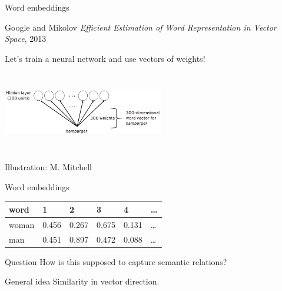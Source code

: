 \documentclass[
  10pt,
  ignorenonframetext,
  x11names, dvipsnames, bibspacing,natbib, table]{beamer}
\begin{document}
\begin{frame}{Word embeddings}
\protect\hypertarget{word-embeddings-6}{}
\begin{block}{Google and Mikolov}
\protect\hypertarget{google-and-mikolov-1}{}
\emph{Efficient Estimation of Word Representation in Vector Space}, 2013

Let's train a neural network and use vectors of weights!

\vspace{2mm}

\begin{center}
 \includegraphics[height = 3.5cm, width = 7cm]{images/word2vec2.png}
\end{center}

\vspace{-3mm}

\tiny \hfill \color{gray}Illustration: M. Mitchell \color{black}
\end{block}
\end{frame}

\begin{frame}{Word embeddings}
\protect\hypertarget{word-embeddings-7}{}
\begin{longtable}[]{@{}llllll@{}}
\toprule
word & 1 & 2 & 3 & 4 & \ldots{} \\
\midrule
\endhead
woman & 0.456 & 0.267 & 0.675 & 0.131 & \ldots{} \\
man & 0.451 & 0.897 & 0.472 & 0.088 & \ldots{} \\
\bottomrule
\end{longtable}

\begin{block}{Question}
\protect\hypertarget{question-1}{}
How is this supposed to capture semantic relations?

\pause
\end{block}

\begin{block}{General idea}
\protect\hypertarget{general-idea}{}
Similarity in vector direction.
\end{block}
\end{frame}
\end{document}
